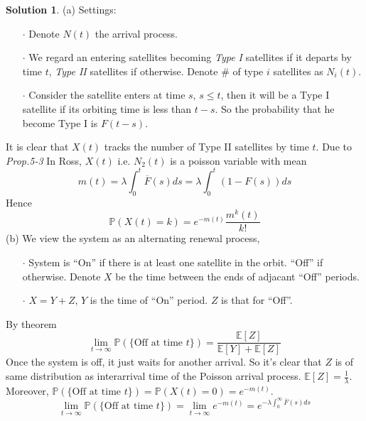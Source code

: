 \documentclass[a4paper, 10pt]{article}
\theoremstyle{definition}
\theoremstyle{hSol}
\newtheorem*{solution}{Solution}
\begin{document}
\begin{solution} (a) Settings:
\begin{itemize}
  \item[$\cdot$] Denote $N(t)$ the arrival process.
  \item[$\cdot$] We regard an entering satellites becoming \emph{Type I} satellites if it departs by time $t$, \emph{Type II} satellites if otherwise. Denote \# of type $i$ satellites as $N_i(t)$.
  \item[$\cdot$] Consider the satellite enters at time $s$, $s\leq t$, then it will be a Type I satellite if its orbiting time is less than $t-s$. So the probability that he become Type I is $F(t-s)$.
\end{itemize}
It is clear that $X(t)$ tracks the number of Type II satellites by time $t$. Due to \emph{Prop.5-3} In Ross, $X(t)$ i.e. $N_2(t)$ is a poisson variable with mean
\begin{equation}
  m(t) = \lambda \int_0^t \overline{F}(s)ds = \lambda \int_0^t (1-F(s))ds
\end{equation}
Hence
\begin{equation}
  \mathbb{P}\left(X(t)=k\right) = e^{-m(t)}\frac{m^k(t)}{k!}
\end{equation}
(b) We view the system as an alternating renewal process,
\begin{itemize}
  \item[$\cdot$] System is ``On'' if there is at least one satellite in the orbit. ``Off'' if otherwise. Denote $X$ be the time between the ends of adjacant ``Off'' periods.
  \item[$\cdot$] $X=Y+Z$, $Y$ is the time of ``On'' period. $Z$ is that for ``Off''.
\end{itemize}
By theorem
\begin{equation}
  \lim\limits_{t\rightarrow\infty}\mathbb{P}\left(\{\text{Off at time $t$}\}\right) = \frac{\mathbb{E}\left[Z\right]}{\mathbb{E}\left[Y\right]+\mathbb{E}\left[Z\right]}
\end{equation}
Once the system is off, it just waits for another arrival. So it's clear that $Z$ is of same distribution as interarrival time of the Poisson arrival process. $\mathbb{E}\left[Z\right]=\frac{1}{\lambda}$. \\
Moreover, $\mathbb{P}\left(\{\text{Off at time $t$}\}\right)=\mathbb{P}\left(X(t)=0\right)=e^{-m(t)}$.
\begin{equation}
  \lim\limits_{t\rightarrow\infty}\mathbb{P}\left(\{\text{Off at time $t$}\}\right) = \lim\limits_{t\rightarrow\infty}e^{-m(t)} =  e^{-\lambda \int_0^{\infty} \overline{F}(s)ds}

\end{equation}
\end{solution}
\end{document}
